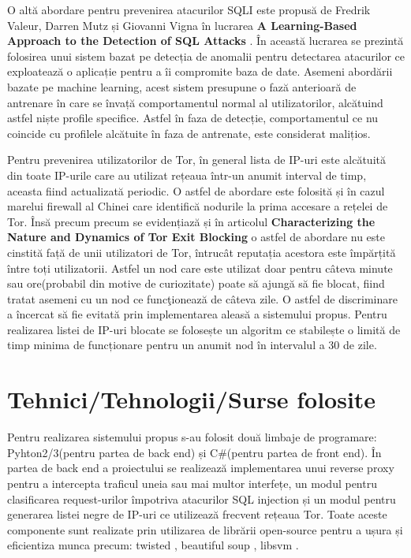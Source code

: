  O altă abordare pentru prevenirea atacurilor SQLI este propusă de Fredrik Valeur, Darren Mutz și Giovanni Vigna în lucrarea \textbf{A Learning-Based Approach to the Detection of SQL Attacks} \cite{sqli_how2}. În această lucrarea se prezintă folosirea unui sistem bazat pe detecția de anomalii pentru detectarea atacurilor ce exploatează o aplicație pentru a îi compromite baza de date. Asemeni abordării bazate pe machine learning, acest sistem presupune o fază anterioară de antrenare în care se învață comportamentul normal al utilizatorilor, alcătuind astfel niște profile specifice. Astfel în faza de detecție, comportamentul ce nu coincide cu profilele alcătuite în faza de antrenate, este considerat malițios. 

Pentru prevenirea utilizatorilor de Tor, în general lista de IP-uri este alcătuită din toate IP-urile care au utilizat rețeaua într-un anumit interval de timp, aceasta fiind actualizată periodic. O astfel de abordare este folosită și în cazul marelui firewall al Chinei  \cite{china_tor}  care identifică nodurile la prima accesare a rețelei de Tor. Însă precum precum se evidențiază și în articolul  \textbf{Characterizing the Nature and Dynamics of Tor Exit Blocking} \cite{tor_1} o astfel de abordare nu este cinstită față de unii utilizatori de Tor, întrucât reputația acestora este împărțită între toți utilizatorii. Astfel un nod care este utilizat doar pentru câteva minute sau ore(probabil din motive de curiozitate) poate să ajungă să fie blocat, fiind tratat asemeni cu un nod ce funcţionează de câteva zile. O astfel de discriminare a încercat să fie evitată prin implementarea aleasă a sistemului propus. Pentru realizarea listei de IP-uri blocate se folosește un algoritm ce stabilește o limită de timp minima de funcționare pentru un anumit nod în intervalul a 30 de zile. 


 \section{Tehnici/Tehnologii/Surse folosite}

Pentru realizarea sistemului propus s-au folosit două limbaje de programare: Pyhton2/3(pentru partea de back end) și C\#(pentru partea de front end). În partea de back end a proiectului se realizează implementarea unui reverse proxy pentru a intercepta traficul uneia sau mai multor interfețe, un modul pentru clasificarea request-urilor împotriva atacurilor SQL injection și un modul pentru generarea listei negre de IP-uri ce utilizează frecvent rețeaua Tor. Toate aceste componente sunt realizate prin utilizarea de librării open-source pentru a ușura și eficientiza munca precum:  twisted \cite{twisted}, beautiful soup \cite{btf_soup}, libsvm \cite{libsvm}.

